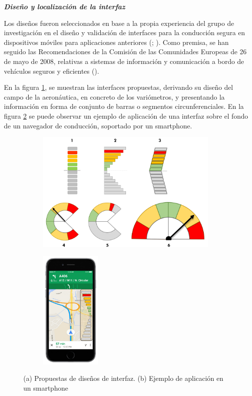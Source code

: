 \textbf{\emph{Diseño y localización de la interfaz}}

Los diseños fueron seleccionados en base a la propia experiencia del grupo de investigación en el diseño y validación de interfaces para la conducción segura en dispositivos móviles para aplicaciones anteriores (\cite{jimenez12}; \cite{jimenez16}). Como premisa, se han seguido las Recomendaciones de la Comisión de las Comunidades Europeas de 26 de mayo de 2008, relativas a sistemas de información y comunicación a bordo de vehículos seguros y eficientes (\cite{european}). 

En la figura \ref{fig:3.8a}, se muestran las interfaces propuestas, derivando su diseño del campo de la aeronáutica, en concreto de los variómetros, y presentando la información en forma de conjunto de barras o segmentos circunferenciales. En la figura \ref{fig:3.8b} se puede observar un ejemplo de aplicación de una interfaz sobre el fondo de un navegador de conducción, soportado por un smartphone.

\newpage
\begin{figure}[htbp]
    \centering
    \begin{subfigure}[b]{0.4\linewidth}
        \centering
        \includegraphics[width=9cm]{figures/3.8a.png}
        \caption{}
        \label{fig:3.8a}
    \end{subfigure}
    \hspace{0.5cm}
    \begin{subfigure}[b]{0.5\linewidth}
        \centering
        \includegraphics[width=3cm]{figures/3.8b.png}
        \caption{}
        \label{fig:3.8b}
    \end{subfigure}
     \caption{(a) Propuestas de diseños de interfaz. (b) Ejemplo de aplicación en un smartphone }
  \label{fig:3.8}
\end{figure}

